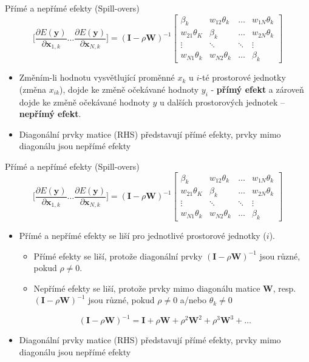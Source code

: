\documentclass{beamer}
\begin{document}
\begin{frame}{Přímé a nepřímé efekty (Spill-overs)}
$$ \bigg[\frac{\partial E(\bm{y})}{\partial \bm{x}_{1,k}} \dots \frac{\partial E(\bm{y})}{\partial \bm{x}_{N,k}}\bigg] =
 (\bm{I} - \rho \bm{W})^{-1} 
\begin{bmatrix}
\beta_k & w_{12}\theta_k & \dots & w_{1N}\theta_k \\
w_{21}\theta_K & \beta_k & \dots & w_{2N}\theta_k \\
\vdots & \ddots & \ddots & \vdots \\
w_{N1}\theta_k & w_{N2}\theta_k & \dots & \beta_k 
\end{bmatrix}
$$
\begin{itemize}
	\item Změním-li hodnotu vysvětlující proměnné $x_k$ u $i$-té prostorové jednotky (změna $x_{ik}$), dojde ke změně očekávané hodnoty $y_i$ - \textbf{přímý efekt} a zároveň dojde ke změně očekávané hodnoty $y$ u dalších prostorových jednotek – \textbf{nepřímý efekt}. 
	\item Diagonální prvky matice (RHS) představují přímé efekty, prvky mimo diagonálu jsou nepřímé efekty
\end{itemize}

\end{frame}
\begin{frame}{Přímé a nepřímé efekty (Spill-overs)}
$$ \bigg[\frac{\partial E(\bm{y})}{\partial \bm{x}_{1,k}} \dots \frac{\partial E(\bm{y})}{\partial \bm{x}_{N,k}}\bigg] =
(\bm{I} - \rho \bm{W})^{-1} 
\begin{bmatrix}
\beta_k & w_{12}\theta_k & \dots & w_{1N}\theta_k \\
w_{21}\theta_K & \beta_k & \dots & w_{2N}\theta_k \\
\vdots & \ddots & \ddots & \vdots \\
w_{N1}\theta_k & w_{N2}\theta_k & \dots & \beta_k 
\end{bmatrix}
$$

\begin{itemize}
	\item Přímé a nepřímé efekty se liší pro jednotlivé prostorové jednotky ($i$).
	\begin{itemize}
	\item 	Přímé efekty se liší, protože diagonální prvky $(\bm{I} - \rho \bm{W})^{-1} $ jsou různé, pokud $\rho \neq 0$.
	\item Nepřímé efekty se liší, protože prvky mimo diagonálu matice $\bm{W}$, resp. $(\bm{I} - \rho \bm{W})^{-1}$ jsou různé, pokud $\rho \neq 0$ a/nebo $\theta_k \neq 0$
\end{itemize}
	$$ (\bm{I} - \rho \bm{W})^{-1} = \bm{I} + \rho\bm{W} + \rho^2\bm{W}^2 + \rho^3\bm{W}^3 + \dots$$

	\item Diagonální prvky matice (RHS) představují přímé efekty, prvky mimo diagonálu jsou nepřímé efekty
\end{itemize}
\end{frame}
\end{document}
